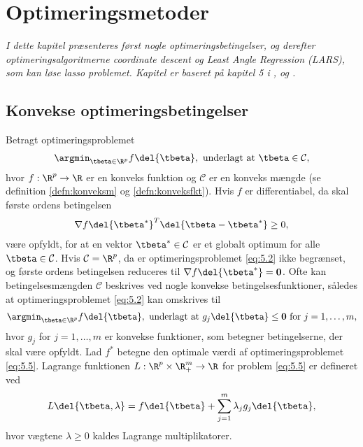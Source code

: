 \chapter{Optimeringsmetoder} \label{ch:optimeringsmetoder}
\textit{I dette kapitel præsenteres først nogle optimeringsbetingelser, og derefter optimeringsalgoritmerne coordinate descent og Least Angle Regression (LARS), som kan løse lasso problemet.
Kapitel er baseret på kapitel 5 i \citep{hastie}, \citep{glmnet1} og \citep{efron}.} 
%
\section{Konvekse optimeringsbetingelser}
Betragt optimeringsproblemet
\begin{align}
\argmin_{\tbeta \in \R^p} f \del{\tbeta}, \text{ underlagt at } \tbeta \in \mathcal{C}, \label{eq:5.2}
\end{align}
hvor \(f: \R^p \rightarrow \R\) er en konveks funktion og \(\mathcal{C}\) er en konveks mængde (se definition \ref{defn:konveksm} og \ref{defn:konveksfkt}).
Hvis \(f\) er differentiabel, da skal første ordens betingelsen
\begin{align}
\nabla f \del{\tbeta^*}^T \del{ \tbeta - \tbeta^*} \geq 0, \label{eq:5.3}
\end{align}
være opfyldt, for at en vektor \(\tbeta^* \in \mathcal{C}\) er et globalt optimum for alle \(\tbeta \in \mathcal{C}\). 
Hvis \(\mathcal{C} = \R^p\), da er optimeringsproblemet \eqref{eq:5.2} ikke begrænset, og første ordens betingelsen reduceres til \(\nabla f \del{\tbeta^*} = \mathbf{0}\).
Ofte kan betingelsesmængden \(\mathcal{C}\) beskrives ved nogle konvekse betingelsesfunktioner, således at optimeringsproblemet \eqref{eq:5.2} kan omskrives til
\begin{align}
\argmin_{\tbeta \in \R^p} f \del{\tbeta}, \text{ underlagt at } g_j \del{\tbeta} \leq \mathbf{0} \text{ for } j = 1, \ldots, m, \label{eq:5.5}
\end{align}
hvor \(g_j\) for \(j=1, \ldots, m\) er konvekse funktioner, som betegner betingelserne, der skal være opfyldt.
Lad \(f^*\) betegne den optimale værdi af optimeringsproblemet \eqref{eq:5.5}.
Lagrange funktionen \(L: \R^p \times \R^m_+ \rightarrow \R\) for problem \eqref{eq:5.5} er defineret ved
\begin{align*}
L \del{\tbeta, \lambda} = f \del{\tbeta} + \sum_{j=1}^m \lambda_j g_j \del{\tbeta},
\end{align*}
hvor vægtene \(\lambda \geq 0\) kaldes Lagrange multiplikatorer.
